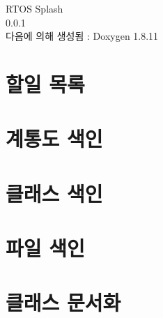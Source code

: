 \documentclass[twoside]{book}
\newcommand{\+}{\discretionary{\mbox{\scriptsize$\hookleftarrow$}}{}{}}
\newcommand{\clearemptydoublepage}{%
  \newpage{\pagestyle{empty}\cleardoublepage}%
}
\begin{document}
\hypersetup{pageanchor=false,
             bookmarksnumbered=true,
             pdfencoding=unicode
            }
\begin{titlepage}
\vspace*{7cm}
\begin{center}%
{\Large R\+T\+OS Splash \\[1ex]\large 0.\+0.\+1 }\\
\vspace*{1cm}
{\large 다음에 의해 생성됨 \+:  Doxygen 1.8.11}\\
\end{center}
\end{titlepage}
\clearemptydoublepage
\tableofcontents
\clearemptydoublepage
{}
\hypersetup{pageanchor=true}

\chapter{할일 목록}
\label{todo}
\hypertarget{todo}{}

\chapter{계통도 색인}

\chapter{클래스 색인}

\chapter{파일 색인}

\chapter{클래스 문서화}
























\end{document}
